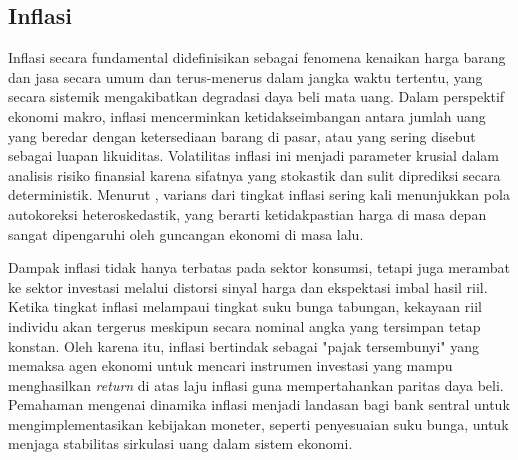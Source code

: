 \subsection{Inflasi}

Inflasi secara fundamental didefinisikan sebagai fenomena kenaikan harga barang dan jasa secara umum dan terus-menerus dalam jangka waktu tertentu, yang secara sistemik mengakibatkan degradasi daya beli mata uang. Dalam perspektif ekonomi makro, inflasi mencerminkan ketidakseimbangan antara jumlah uang yang beredar dengan ketersediaan barang di pasar, atau yang sering disebut sebagai luapan likuiditas. Volatilitas inflasi ini menjadi parameter krusial dalam analisis risiko finansial karena sifatnya yang stokastik dan sulit diprediksi secara deterministik. Menurut \cite{engle_1982}, varians dari tingkat inflasi sering kali menunjukkan pola autokoreksi heteroskedastik, yang berarti ketidakpastian harga di masa depan sangat dipengaruhi oleh guncangan ekonomi di masa lalu.

Dampak inflasi tidak hanya terbatas pada sektor konsumsi, tetapi juga merambat ke sektor investasi melalui distorsi sinyal harga dan ekspektasi imbal hasil riil. Ketika tingkat inflasi melampaui tingkat suku bunga tabungan, kekayaan riil individu akan tergerus meskipun secara nominal angka yang tersimpan tetap konstan. Oleh karena itu, inflasi bertindak sebagai "pajak tersembunyi" yang memaksa agen ekonomi untuk mencari instrumen investasi yang mampu menghasilkan \textit{return} di atas laju inflasi guna mempertahankan paritas daya beli. Pemahaman mengenai dinamika inflasi menjadi landasan bagi bank sentral untuk mengimplementasikan kebijakan moneter, seperti penyesuaian suku bunga, untuk menjaga stabilitas sirkulasi uang dalam sistem ekonomi.

